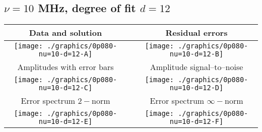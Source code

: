 

% 

\clearpage{}
\break{}

\subsection{$\nu = 10$ MHz, degree of fit $d = 12$}

\begin{table}[h]
    \begin{center}
        \begin{tabular}{ccc}
            Data and solution & \quad & Residual errors \\\hline
            \texttt{[image: ./graphics/0p080-nu=10-d=12-A]} &&
            \texttt{[image: ./graphics/0p080-nu=10-d=12-B]} \\[15pt]
            Amplitudes with error bars && Amplitude signal--to--noise \\\hline
            \texttt{[image: ./graphics/0p080-nu=10-d=12-C]} &&
            \texttt{[image: ./graphics/0p080-nu=10-d=12-D]} \\[15pt]
            Error spectrum $2-$norm && Error spectrum $\infty-$norm \\\hline
            \texttt{[image: ./graphics/0p080-nu=10-d=12-E]} &&
            \texttt{[image: ./graphics/0p080-nu=10-d=12-F]} \\[15pt]
        \end{tabular}
    \end{center}
\label{fig:elev=80, nu=10}
\end{table}



\endinput

